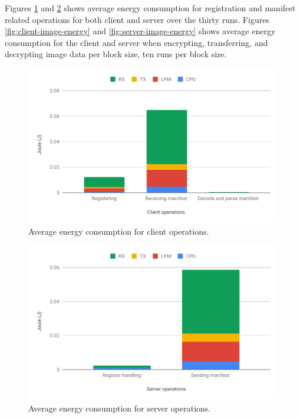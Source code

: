 \documentclass[0-thesis.tex]{subfiles}
\begin{document}
Figures \ref{fig:client-operations-energy} and \ref{fig:server-operations-energy} shows
average energy consumption for registration and manifest related operations for both
client and server over the thirty runs. Figures \ref{fig:client-image-energy} and
\ref{fig:server-image-energy} shows average energy consumption for the client and server
when encrypting, transferring, and decrypting image data per block size, ten runs per
block size. 

\begin{figure}[h!]
    \caption{Average energy consumption for client operations.}
    \label{fig:client-operations-energy}
    \includegraphics[scale=0.65]{images/client-operations-energy.pdf}
\end{figure}

\begin{figure}[h!]
    \caption{Average energy consumption for server operations.}
    \label{fig:server-operations-energy}
    \includegraphics[scale=0.65]{images/server-operations-energy.pdf}
\end{figure}
\end{document}
